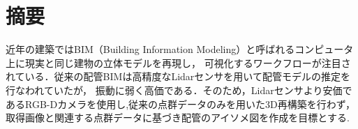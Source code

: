 \section*{%
摘要}

近年の建築ではBIM（Building Information Modeling）と呼ばれるコンピュータ上に現実と同じ建物の立体モデルを再現し，
可視化するワークフローが注目されている．従来の配管BIMは高精度なLidarセンサを用いて配管モデルの推定を行なわれていたが，
振動に弱く高価である．そのため，Lidarセンサより安価であるRGB-Dカメラを使用し,従来の点群データのみを用いた3D再構築を行わず，
取得画像と関連する点群データに基づき配管のアイソメ図を作成を目標とする.

